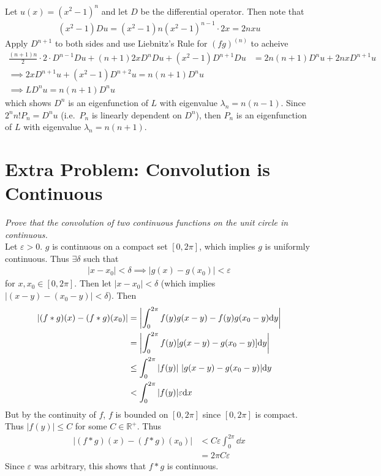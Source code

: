 \documentclass[12pt]{article}
\newcommand{\E}{\varepsilon}
\theoremstyle{plain}
\begin{document}
\begin{enumerate}[(a)]
        Let $u(x) = (x^2 - 1)^n$ and let $D$ be the differential operator.  Then note that
        \begin{align*}
            (x^2 - 1)Du = (x^2 - 1)n(x^2 - 1)^{n-1} \cdot 2x = 2nxu
        \end{align*}
        Apply $D^{n+1}$ to both sides and use Liebnitz's Rule for $(fg)^{(n)}$ to acheive
        \begin{align*}
            \frac{(n+1)n}{2}\cdot 2\cdot D^{n-1}Du + (n+1)2x D^n Du + (x^2 - 1)D^{n+1}Du &= 2n(n+1)D^nu + 2nxD^{n+1}u \\
            \implies 2xD^{n+1}u + (x^2 - 1)D^{n+2}u = n(n+1)D^n u\\
            \implies LD^nu = n(n+1)D^n u
        \end{align*}
        which shows $D^n$ is an eigenfunction of $L$ with eigenvalue $\lambda_n = n(n-1)$.  Since $2^n n! P_n = D^nu$ (i.e.~$P_n$ is linearly dependent on $D^n$), then $P_n$ is an eigenfunction of $L$ with eigenvalue $\lambda_n = n(n+1)$.
\end{enumerate}

\section*{Extra Problem: Convolution is Continuous}
\emph{Prove that the convolution of two continuous functions on the unit circle in continuous.} \\

Let $\E > 0$.  $g$ is continuous on a compact set $[0, 2\pi]$, which implies $g$ is uniformly continuous.  Thus $\exists \delta$ such that
\begin{align*}
    |x - x_0| < \delta \implies |g(x) - g(x_0)| < \E
\end{align*}
for $x, x_0\in [0, 2\pi]$.  Then let $|x - x_0| < \delta$ (which implies $|(x-y) - (x_0-y)| < \delta$).  Then
\begin{align*}
    |(f*g)(x) - (f*g)(x_0)| &= \left|\int_0^{2\pi}f(y)g(x-y) - f(y)g(x_0 - y) \dd y\right| \\
    &= \left|\int_0^{2\pi} f(y)\qty[g(x-y) - g(x_0 - y)]\dd y\right| \\
    &\leq \int_0^{2\pi} |f(y)|\ |g(x-y) - g(x_0 - y)| \dd y \\
    &< \int_0^{2\pi}|f(y)| \E \dd x
\end{align*}
But by the continuity of $f$, $f$ is bounded on $[0, 2\pi]$ since $[0, 2\pi]$ is compact.  Thus $|f(y)| \leq C$ for some $C \in \mathbb{R}^+$.  Thus
\begin{align*}
    |(f*g)(x) - (f*g)(x_0)| &< C\E\int_0^{2\pi}\dd x \\
    &= 2\pi C\E
\end{align*}
Since $\E$ was arbitrary, this shows that $f*g$ is continuous.
\end{document}
